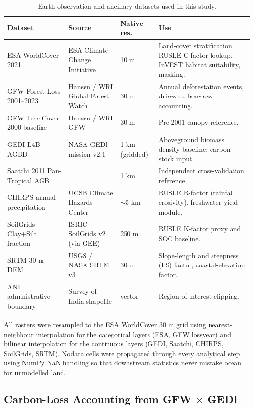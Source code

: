 \documentclass[12pt,a4paper]{article}
\begin{document}
\begin{table}[H]
\centering
\caption{Earth-observation and ancillary datasets used in this study.}
\label{tab:datasets}
\small
\begin{tabular}{p{4.0cm} p{3.3cm} p{1.8cm} p{5.5cm}}
\toprule
\rowcolor{forestgreen!15}
\textbf{Dataset} & \textbf{Source} & \textbf{Native res.} & \textbf{Use}\\
\midrule
ESA WorldCover 2021 & ESA Climate Change Initiative & 10 m & Land-cover stratification, RUSLE C-factor lookup, InVEST habitat suitability, masking. \\
GFW Forest Loss 2001--2023 & Hansen / WRI Global Forest Watch & 30 m & Annual deforestation events, drives carbon-loss accounting. \\
GFW Tree Cover 2000 baseline & Hansen / WRI GFW & 30 m & Pre-2001 canopy reference. \\
GEDI L4B AGBD & NASA GEDI mission v2.1 & 1 km (gridded) & Aboveground biomass density baseline; carbon-stock input. \\
Saatchi 2011 Pan-Tropical AGB & \citet{saatchi2011} & 1 km & Independent cross-validation reference. \\
CHIRPS annual precipitation & UCSB Climate Hazards Center & $\sim$5 km & RUSLE R-factor (rainfall erosivity), freshwater-yield module. \\
SoilGrids Clay+Silt fraction & ISRIC SoilGrids v2 (via GEE) & 250 m & RUSLE K-factor proxy and SOC baseline. \\
SRTM 30 m DEM & USGS / NASA SRTM v3 & 30 m & Slope-length and steepness (LS) factor, coastal-elevation factor. \\
ANI administrative boundary & Survey of India shapefile & vector & Region-of-interest clipping. \\
\bottomrule
\end{tabular}
\end{table}

All rasters were resampled to the ESA WorldCover 30 m grid using
nearest-neighbour interpolation for the categorical layers (ESA,
GFW lossyear) and bilinear interpolation for the continuous layers
(GEDI, Saatchi, CHIRPS, SoilGrids, SRTM). Nodata cells were
propagated through every analytical step using NumPy NaN handling so
that downstream statistics never mistake ocean for unmodelled land.

\subsection{Carbon-Loss Accounting from GFW $\times$ GEDI}
\label{sec:methods-carbon}
\end{document}
